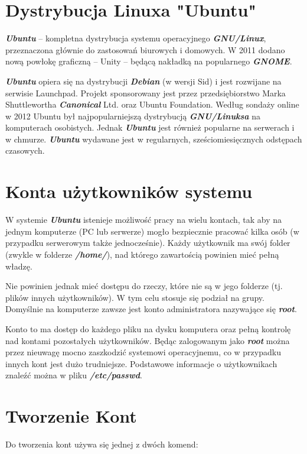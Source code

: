 \documentclass{article}
\begin{document}
\section{Dystrybucja Linuxa "Ubuntu"}
\emph{\textbf{Ubuntu}} – kompletna dystrybucja systemu operacyjnego \emph{\textbf{GNU/Linux}}, przeznaczona głównie do zastosowań biurowych i domowych. W 2011 dodano nową powłokę graficzną – Unity – będącą nakładką na popularnego \emph{\textbf{GNOME}}.

\emph{\textbf{Ubuntu}} opiera się na dystrybucji \emph{\textbf{Debian}} (w wersji Sid) i jest rozwijane na serwisie Launchpad. Projekt sponsorowany jest przez przedsiębiorstwo Marka Shuttlewortha \emph{\textbf{Canonical}} Ltd. oraz Ubuntu Foundation. Według sondaży online w 2012 Ubuntu był najpopularniejszą dystrybucją \emph{\textbf{GNU/Linuksa}} na komputerach osobistych. Jednak \emph{\textbf{Ubuntu}} jest również popularne na serwerach i w chmurze. \emph{\textbf{Ubuntu}} wydawane jest w regularnych, sześciomiesięcznych odstępach czasowych.






\section{Konta użytkowników systemu}
W systemie \emph{\textbf{Ubuntu}} istenieje  możliwość pracy na wielu kontach, tak aby na jednym komputerze (PC lub serwerze) mogło bezpiecznie pracować kilka
osób (w przypadku serwerowym także jednocześnie). Każdy użytkownik ma swój folder
(zwykle w folderze \emph{\textbf{/home/}}), nad którego zawartością powinien mieć pełną władzę. \par 
Nie powinien jednak mieć dostępu do rzeczy, które nie są w jego folderze (tj. plików innych użytkowników). W tym celu stosuje się podział na grupy. Domyślnie na komputerze zawsze jest konto administratora nazywające się 
\emph{\textbf{root}}.\par
Konto to ma dostęp do każdego pliku na dysku komputera oraz pełną kontrolę nad kontami pozostałych użytkowników. Będąc zalogowanym jako \emph{\textbf{root}} można przez nieuwagę
mocno zaszkodzić systemowi operacyjnemu, co w przypadku innych kont jest dużo trudniejsze. Podstawowe informacje o użytkownikach znaleźć można w pliku \emph{\textbf{/etc/passwd}}.





\newpage
\section{Tworzenie Kont}
Do tworzenia kont używa się jednej z dwóch komend:
\end{document}
